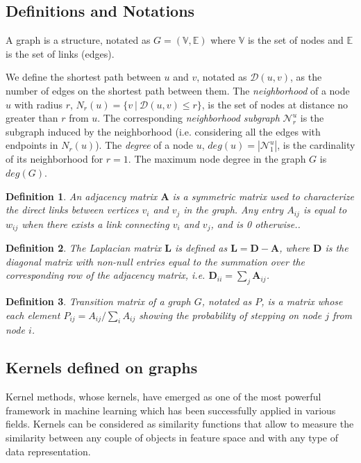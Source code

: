\documentclass[review]{elsarticle}
\newtheorem{definition}{Definition}
\begin{document}
\subsection{Definitions and Notations}
A graph is a structure, notated as $G=(\mathbb{V},\mathbb{E})$ where $\mathbb{V}$ is the set of nodes and $\mathbb{E}$ is the set of links (edges).

We define the shortest path between $u$ and $v$, notated as $\mathcal{D}(u,v)$, as the number of edges on the shortest path between them. The \textit{neighborhood} of a node $u$ with radius $r$, $N_r(u) = \lbrace v\ |\ \mathcal{D}(u,v) \leq r \rbrace$, is the set of nodes at distance no greater than $r$ from $u$. The corresponding \textit{neighborhood subgraph} $\mathcal{N}_{r}^{u}$ is the  subgraph induced by the neighborhood (i.e. considering all the edges with endpoints in $N_r(u)$). The \textit{degree} of a node $u$, $deg(u) = |\mathcal{N}_{1}^{u}|$, is the cardinality of its neighborhood for $r=1$. The maximum node degree in the graph $G$ is $deg(G)$.

\begin{definition}{}
\textit{An adjacency matrix $\textbf{A}$ is a symmetric matrix used to characterize the direct links between vertices $v_{i}$ and $v_{j}$ in the graph. Any entry $A_{ij}$ is equal to $w_{ij}$ when there exists a link connecting $v_{i}$ and $v_{j}$, and is 0 otherwise.}. 
\end{definition}

\begin{definition}{}
\textit{The Laplacian matrix $\textbf{L}$ is defined as $\textbf{L} = \textbf{D}-\textbf{A}$, where $\textbf{D}$ is the diagonal matrix with non-null entries equal to the summation over the corresponding row of the adjacency matrix, i.e. $\textbf{D}_{ii}=\sum_j \textbf{A}_{ij}$.}
\end{definition}

\begin{definition}{}
\textit{Transition matrix of a graph $G$, notated as $P$, is a matrix whose each element $P_{ij} = A_{ij}/\sum_{i}^{}A_{ij}$ showing the probability of stepping on node $j$ from node $i$.}
\end{definition}

\subsection{Kernels defined on graphs}
Kernel methods, whose kernels, have emerged as one of the most powerful framework in machine learning which has been successfully applied in various fields. Kernels can be considered as similarity functions that allow to measure the similarity between any couple of objects in feature space and with any type of data representation. 
\end{document}
